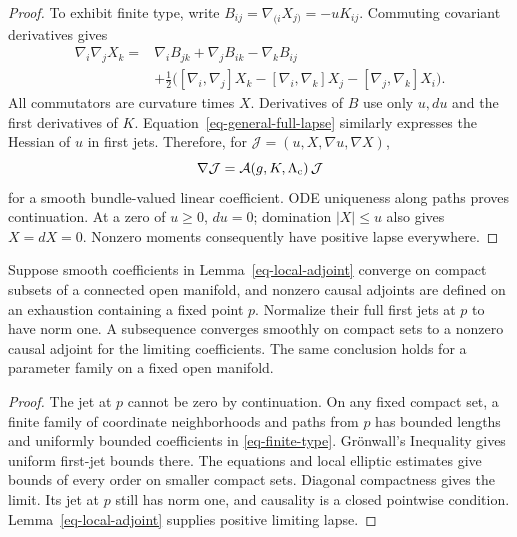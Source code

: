 \begin{proof}
To exhibit finite type, write \(B_{ij}=\nabla_{(i}X_{j)}=-uK_{ij}\).
Commuting covariant derivatives gives
\[
 \begin{split}
 \nabla_i\nabla_jX_k
 ={}&\nabla_iB_{jk}+\nabla_jB_{ik}-\nabla_kB_{ij}\\
 &+\tfrac12\big([\nabla_i,\nabla_j]X_k
       -[\nabla_i,\nabla_k]X_j-[\nabla_j,\nabla_k]X_i\big).
 \end{split}
\]
All commutators are curvature times \(X\).  Derivatives of \(B\)
use only \(u,du\) and the first derivatives of \(K\).
Equation~\eqref{eq-general-full-lapse} similarly expresses the
Hessian of \(u\) in first jets.  Therefore, for
\(\mathcal J=(u,X,\nabla u,\nabla X)\),
\begin{equation}
 \nabla\mathcal J=\mathcal A(g,K,\Lambda_{\rm c})\,\mathcal J
 \label{eq-finite-type}
\end{equation}
for a smooth bundle-valued linear coefficient.  ODE uniqueness
along paths proves continuation.  At a zero of \(u\geq0\),
\(du=0\); domination \(|X|\leq u\) also gives \(X=dX=0\).
Nonzero moments consequently have positive lapse everywhere.
\end{proof}

\begin{lemma}
\label{eq-jet-compactness}
Suppose smooth coefficients in Lemma~\ref{eq-local-adjoint} converge
on compact subsets of a connected open manifold, and nonzero causal
adjoints are defined on an exhaustion containing a fixed point \(p\).
Normalize their full first jets at \(p\) to have norm one.
A subsequence converges smoothly on compact sets to a nonzero causal
adjoint for the limiting coefficients.  The same conclusion holds
for a parameter family on a fixed open manifold.
\end{lemma}

\begin{proof}
The jet at \(p\) cannot be zero by continuation.  On any fixed compact
set, a finite family of coordinate neighborhoods and paths from \(p\)
has bounded lengths and uniformly bounded coefficients in
\eqref{eq-finite-type}.  Grönwall's Inequality gives uniform first-jet
bounds there.  The equations and local elliptic estimates give bounds
of every order on smaller compact sets.  Diagonal compactness gives
the limit.  Its jet at \(p\) still has norm one, and causality is a
closed pointwise condition.  Lemma~\ref{eq-local-adjoint} supplies
positive limiting lapse.
\end{proof}

